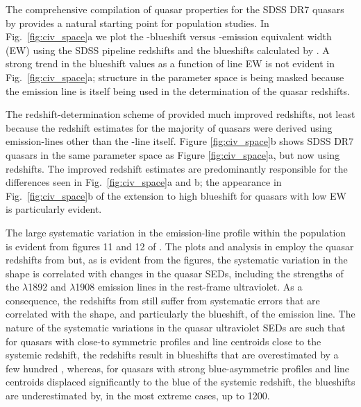 The comprehensive compilation of quasar properties for the SDSS DR7 quasars by \citet{shen11} provides a natural starting point for population studies. 
In Fig.~\ref{fig:civ_space}a we plot the -blueshift versus -emission equivalent width (EW) using the SDSS pipeline redshifts and the blueshifts calculated by \citet{shen11}.  
A strong trend in the blueshift values as a function of line EW is not evident in Fig.~\ref{fig:civ_space}a; structure in the parameter space is being masked because the  emission line is itself being used in the determination of the quasar redshifts. 

The redshift-determination scheme of \citet{hewett10} provided much improved redshifts, not least because the redshift estimates for the majority of quasars were derived using emission-lines other than the -line itself. 
Figure \ref{fig:civ_space}b shows SDSS DR7 quasars in the same  parameter space as Figure \ref{fig:civ_space}a, but now using \citet{hewett10} redshifts. 
The improved redshift estimates are predominantly responsible for the differences seen in Fig.~\ref{fig:civ_space}a and b; the appearance in Fig.~\ref{fig:civ_space}b of the extension to high blueshift for quasars with low  EW is particularly evident.

The large systematic variation in the  emission-line profile within the population is evident from figures 11 and 12 of \citet{richards11}. 
The plots and analysis in \citet{richards11} employ the quasar redshifts from \citet{hewett10} but, as is evident from the figures, the systematic variation in the  shape is correlated with changes in the quasar SEDs, including the strengths of the $\lambda$1892 and $\lambda$1908 emission lines in the rest-frame ultraviolet. As a consequence, the redshifts from \citet{hewett10} still suffer from systematic errors that are correlated with the shape, and particularly the blueshift, of the  emission line.
The nature of the systematic variations in the quasar ultraviolet SEDs are such that for quasars with close-to symmetric  profiles and line centroids close to the systemic redshift, the \citet{hewett10} redshifts result in  blueshifts that are overestimated by a few hundred \kms, whereas, for quasars with strong blue-asymmetric  profiles and line centroids displaced significantly to the blue of the systemic redshift, the  blueshifts are underestimated by, in the most extreme cases, up to 1200\kms. 

